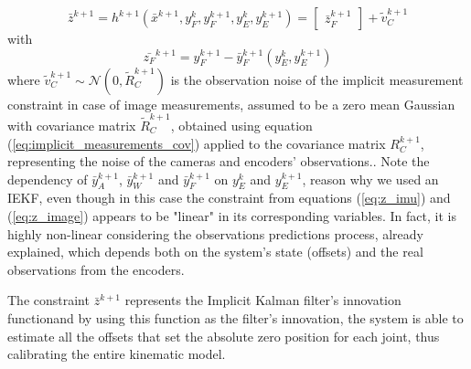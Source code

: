 \begin{dmath}
\bar{z}^{k+1}=h^{k+1}\left(\bar{x}^{k+1},y_{F}^{k},y_{F}^{k+1},y_{E}^{k},y_{E}^{k+1}\right)=\begin{bmatrix}\bar{z}_{F}^{k+1}\end{bmatrix}+\tilde{v}_{C}^{k+1}
\end{dmath}
with
\begin{dmath}
\bar{z_{F}}^{k+1}=y_{F}^{k+1}-\bar{y}_{F}^{k+1}\left(y_{E}^{k},y_{E}^{k+1}\right)
\label{eq:z_image}
\end{dmath}
where $\tilde{v}_C^{k+1}\sim \mathcal{N}\left(0,\tilde{R}_C^{k+1}\right)$ is the observation noise of the implicit measurement constraint in case of image measurements, assumed to be a zero mean Gaussian with covariance matrix $\tilde{R}_C^{k+1}$, obtained using equation (\ref{eq:implicit_measurements_cov}) applied to the covariance matrix $R_C^{k+1}$, representing the noise of the cameras and encoders' observations.. Note the dependency of $\bar{y}_{A}^{k+1}$, $\bar{y}_{W}^{k+1}$ and $\bar{y}_{F}^{k+1}$ on $y_{E}^{k}$ and $y_{E}^{k+1}$, reason why we used an IEKF, even though in this case the constraint from equations (\ref{eq:z_imu}) and (\ref{eq:z_image}) appears to be "linear" in its corresponding variables. In fact, it is highly non-linear considering the observations predictions process, already explained, which depends both on the system's state (offsets) and the real observations from the encoders.

The constraint $\bar{z}^{k+1}$ represents the Implicit Kalman filter's innovation functionand by using this function as the filter's innovation, the system is able to estimate all the offsets that set the absolute zero position for each joint, thus calibrating the entire kinematic model.